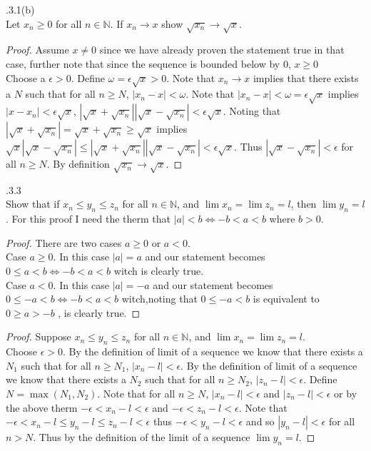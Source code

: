 \documentclass[12pt]{article}
\makeatletter
\theoremstyle{homework}
\newenvironment{exercise}[1]
{\def\@currentlabel{#1}\exercisecore}
{\endexercisecore}
\makeatother
\begin{document}
\begin{exercise}

2.3.1(b)\\
Let $x_n\geq 0$ for all $n\in\mathbb{N}$.  If $x_n\rightarrow x$ show $\sqrt{x_n}\rightarrow \sqrt{x}$.
\end{exercise}
\begin{proof}
Assume $x\neq0$ since we have already proven the statement true in that case, further note that since the sequence is bounded below by $0$, $x\geq 0$\\
Choose a $\epsilon>0$.  Define $\omega=\epsilon \sqrt{x}>0$.  Note that $x_n\rightarrow x$ implies that there exists a $N$ such that for all $n\geq N$, $|x_n-x|<\omega$.  Note that $|x_n-x|<\omega=\epsilon \sqrt{x}$ implies $|x-x_n|<\epsilon \sqrt{x}$, $|\sqrt{x}+\sqrt{x_n}||\sqrt{x}-\sqrt{x_n}|<\epsilon \sqrt{x}$.  Noting that $|\sqrt{x}+\sqrt{x_n}|=\sqrt{x}+\sqrt{x_n}\geq \sqrt{x}$ implies $\sqrt{x}|\sqrt{x}-\sqrt{x_n}| \leq|\sqrt{x}+\sqrt{x_n}||\sqrt{x}-\sqrt{x_n}|<\epsilon \sqrt{x}$.  Thus $|\sqrt{x}-\sqrt{x_n}|<\epsilon$ for all $n\geq N$.  By definition $\sqrt{x_n}\rightarrow \sqrt{x}$.
\end{proof}

\begin{exercise}

2.3.3\\
Show that if $x_n\leq y_n\leq z_n$ for all $n\in\mathbb{N}$, and $\lim x_n=\lim z_n=l$, then $\lim y_n=l$.
\end{exercise}
For this proof I need the therm that $|a|<b\Leftrightarrow -b<a<b$ where $b>0$.
\begin{proof}
There are two cases $a\geq 0$ or $a<0$.\\
Case $a\geq 0$.  In this case $|a|=a$ and our statement becomes $0\leq a<b\Leftrightarrow -b<a<b$ witch is clearly true.\\
Case $a< 0$.  In this case $|a|=-a$ and our statement becomes $0\leq -a<b\Leftrightarrow -b<a<b$ witch,noting that $0\leq -a<b$ is equivalent to $0\geq a>-b$ , is clearly true.
\end{proof}
\begin{proof}
Suppose $x_n\leq y_n\leq z_n$ for all $n\in\mathbb{N}$, and $\lim x_n=\lim z_n=l$.\\
Choose $\epsilon>0$.  By the definition of limit of a sequence we know that there exists a $N_1$ such that for all $n\geq N_1$, $|x_n-l|<\epsilon$.  By the definition of limit of a sequence we know that there exists a $N_2$ such that for all $n\geq N_2$, $|z_n-l|<\epsilon$.  Define $N=\max(N_1,N_2)$.  Note that for all $n\geq N$, $|x_n-l|<\epsilon$ and $|z_n-l|<\epsilon$ or by the above therm $-\epsilon< x_n-l<\epsilon$ and $-\epsilon< z_n-l<\epsilon$.  Note that $-\epsilon<x_n-l\leq y_n-l\leq z_n-l<\epsilon$ thus $-\epsilon<y_n-l<\epsilon$ and so $|y_n-l|<\epsilon$ for all $n>N$.  Thus by the definition of the limit of a sequence $\lim y_n=l$.
\end{proof}
\end{document}
